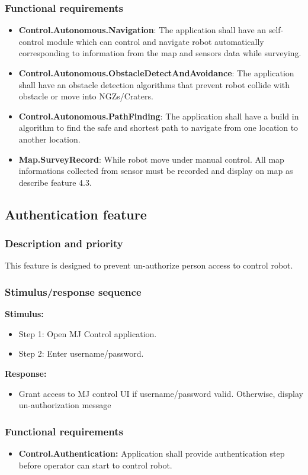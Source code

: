 \documentclass[10pt,a4paper,titlepage]{article}
\begin{document}
	\subsubsection{Functional requirements}
	\begin{itemize}
		\item \textbf{Control.Autonomous.Navigation}: The application shall have an self-control module which can control and navigate robot automatically corresponding to information from the map and sensors data while surveying.
		\item \textbf{Control.Autonomous.ObstacleDetectAndAvoidance}: The application shall have an obstacle detection algorithms that prevent robot collide with obstacle or move into NGZs/Craters.
		\item \textbf{Control.Autonomous.PathFinding}: The application shall have a build in algorithm to find the safe and shortest path to navigate from one location to another location.
		\item \textbf{Map.SurveyRecord}: While robot move under manual control. All map informations collected from sensor must be recorded and display on map as describe feature 4.3.
	\end{itemize}
 
 
	 \subsection{Authentication feature }
	 \subsubsection{Description and priority}
	 \text This feature is designed to prevent un-authorize person access to control robot.
	 \subsubsection{Stimulus/response sequence}
	 \textbf{Stimulus:}
	 \begin{itemize}
	 	\item Step 1: Open MJ Control application.
	 	\item Step 2: Enter username/password.
	 \end{itemize}
	 \textbf{Response:}
	\begin{itemize}
		\item Grant access to MJ control UI if username/password valid. Otherwise, display un-authorization message
	\end{itemize}
	 \subsubsection{Functional requirements}
	 \begin{itemize}
	 	\item \textbf{Control.Authentication:}  Application shall provide authentication step before operator can start to control robot.
	 \end{itemize}
\newpage	
\end{document}
